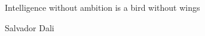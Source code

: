 \newpage
\null\vfill
\begin{flushright}
\begin{minipage}{9.0cm}

Intelligence without ambition is a bird without wings

\end{minipage}
\end{flushright}


\begin{flushright}
Salvador Dali
\end{flushright}

\newpage %

\null
